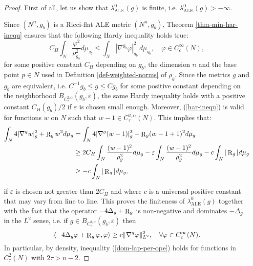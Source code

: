 \documentclass[a4paper,11pt,reqno]{amsart}
\def\R{\mathop{\rm R}\nolimits}
\numberwithin{equation}{section}
\begin{document}
	\begin{proof}
		First of all, let us show that $\lambda_{\operatorname{ALE}}^0(g)$ is finite, i.e. $\lambda_{\operatorname{ALE}}^0(g)>-\infty$.
		
		Since $(N^n,g_b)$ is a Ricci-flat ALE metric $(N^n,g_b)$, Theorem \ref{thm-min-har-inequ} ensures that the following Hardy inequality holds true:
		\begin{equation}
		C_H\int_N\frac{\varphi^2}{\rho_{g_b}^2}d\mu_{g_b}\leq \int_N|\nabla^{g_b}\varphi|_{g_b}^2\,d\mu_{g_b},\quad \varphi\in C_c^{\infty}(N),\label{har-inequ}
		\end{equation}
		for some positive constant $C_H$ depending on $g_b$, the dimension $n$ and the base point $p\in N$ used in Definition \ref{def-weighted-norms} of $\rho_g$.
		Since the metrics $g$ and $g_b$ are equivalent, i.e. $C^{-1}g_b\leq g\leq Cg_b$ for some positive constant depending on the neighborhood $B_{C^{2,\alpha}_{\tau}}(g_b,\varepsilon)$, the same Hardy inequality holds with a positive constant $C_H(g_b)/2$ if $\varepsilon$ is chosen small enough. Moreover, (\ref{har-inequ}) is valid for functions $w$ on $N$ such that $w-1\in C_{\tau}^{2,\alpha}(N)$. This implies that:
		\begin{equation*}
		\begin{split}
		\int_N4|\nabla^gw|^2_g+\R_gw^2d\mu_g&=\int_N4|\nabla^g(w-1)|^2_g+\R_g(w-1+1)^2d\mu_g\\
		&\geq2C_H\int_N\frac{(w-1)^2}{\rho_g^2}d\mu_g-\varepsilon\int_N\frac{(w-1)^2}{\rho_g^2}d\mu_g-c\int_N|\R_g|d\mu_g\\
		&\geq-c\int_N|\R_g|d\mu_g,
		\end{split}
		\end{equation*}
		
		if $\varepsilon$ is chosen not greater than $2C_H$ and where $c$ is a universal positive constant that may vary from line to line. 
		This proves the finiteness of $\lambda_{\operatorname{ALE}}^0(g)$ together with the fact that the operator $-4\Delta_g+\R_g$ is non-negative and dominates $-\Delta_g$ in the $L^2$ sense, i.e. if $g\in B_{C^{2,\alpha}_{\tau}}(g_b,\varepsilon)$ then
		\begin{equation}
		\langle-4\Delta_g\varphi+\R_g\varphi,\varphi\rangle\geq c\|\nabla^g\varphi\|^2_{L^2},\quad \forall \varphi\in C_c^{\infty}(N).\label{dom-lap-per-ope}
		\end{equation}
		In particular, by density, inequality (\ref{dom-lap-per-ope}) holds for functions in $C^2_{\tau}(N)$ with $2\tau>n-2$. 
		

\end{proof}
\end{document}
